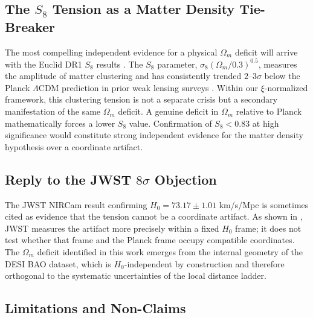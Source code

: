 \documentclass[12pt,a4paper]{article}
\begin{document}
\subsection{The $S_8$ Tension as a Matter Density Tie-Breaker}

The most compelling independent evidence for a physical $\Omega_m$ deficit will
arrive with the Euclid DR1 $S_8$ results \citep{Euclid2022_Survey}. The $S_8$
parameter, $\sigma_8(\Omega_m/0.3)^{0.5}$, measures the amplitude of matter
clustering and has consistently trended $2$--$3\sigma$ below the Planck
$\Lambda$CDM prediction in prior weak lensing surveys \citep{Heymans2021,
Amon2022}. Within our $\xi$-normalized framework, this clustering tension is
not a separate crisis but a secondary manifestation of the same $\Omega_m$
deficit. A genuine deficit in $\Omega_m$ relative to Planck mathematically
forces a lower $S_8$ value. Confirmation of $S_8 < 0.83$ at high significance
would constitute strong independent evidence for the matter density hypothesis
over a coordinate artifact.

\subsection{Reply to the JWST $8\sigma$ Objection}

The JWST NIRCam result \citep{Riess2023} confirming $H_0 = 73.17 \pm 1.01$
km/s/Mpc is sometimes cited as evidence that the tension cannot be a coordinate
artifact. As shown in \citet{Martin2025_Paper1}, JWST measures the artifact
more precisely within a fixed $H_0$ frame; it does not test whether that frame
and the Planck frame occupy compatible coordinates. The $\Omega_m$ deficit
identified in this work emerges from the internal geometry of the DESI BAO
dataset, which is $H_0$-independent by construction and therefore orthogonal to
the systematic uncertainties of the local distance ladder.

\subsection{Limitations and Non-Claims}
\label{sec:limitations}
\end{document}
